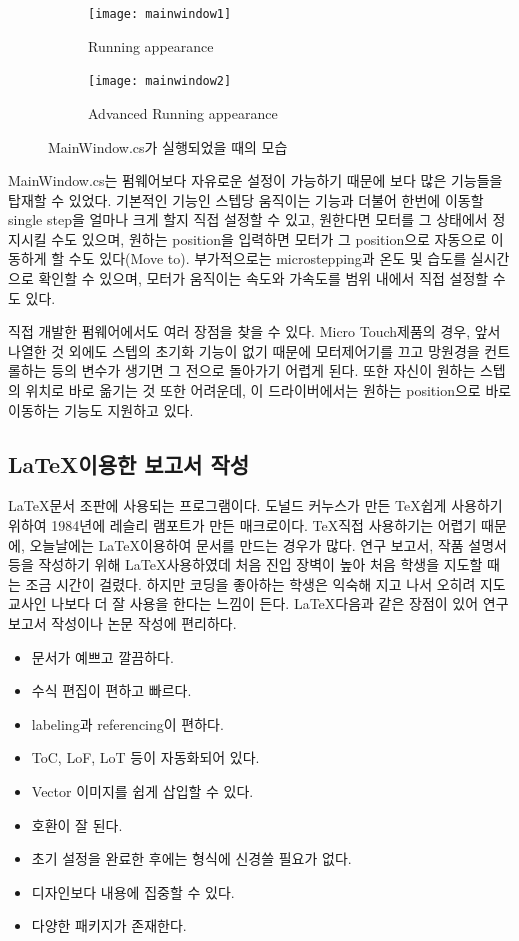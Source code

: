 \begin{figure}[h]
	\begin{subfigure}{0.5\textwidth}
		\begin{center}
			\texttt{[image: mainwindow1]} 
		\end{center}	
		\caption{Running appearance}
		\label{fig:mainwindow1}
	\end{subfigure}
	\begin{subfigure}{0.5\textwidth}
		\begin{center}			
			\texttt{[image: mainwindow2]}
		\end{center}
		\caption{Advanced Running appearance}
		\label{fig:mainwindow2}
	\end{subfigure}
	\caption{MainWindow.cs가 실행되었을 때의 모습}
	\label{fig:mainwindow}
\end{figure}

MainWindow.cs는 펌웨어보다 자유로운 설정이 가능하기 때문에 보다 많은 기능들을 탑재할 수 있었다. 기본적인 기능인 스텝당 움직이는 기능과 더불어 한번에 이동할 single step을 얼마나 크게 할지 직접 설정할 수 있고, 원한다면 모터를 그 상태에서 정지시킬 수도 있으며, 원하는 position을 입력하면 모터가 그 position으로 자동으로 이동하게 할 수도 있다(Move to). 부가적으로는 microstepping과 온도 및 습도를 실시간으로 확인할 수 있으며, 모터가 움직이는 속도와 가속도를 범위 내에서 직접 설정할 수도 있다.

직접 개발한 펌웨어에서도 여러 장점을 찾을 수 있다. Micro Touch제품의 경우, 앞서 나열한 것 외에도 스텝의 초기화 기능이 없기 때문에 모터제어기를 끄고 망원경을 컨트롤하는 등의 변수가 생기면 그 전으로 돌아가기 어렵게 된다. 또한 자신이 원하는 스텝의 위치로 바로 옮기는 것 또한 어려운데, 이 드라이버에서는 원하는 position으로 바로 이동하는 기능도 지원하고 있다. 


\subsection{\LaTeX\를 이용한 보고서 작성}

\LaTeX\은 문서 조판에 사용되는 프로그램이다. 도널드 커누스가 만든 \TeX\을 쉽게 사용하기 위하여 1984년에 레슬리 램포트가 만든 매크로이다. \TeX\을 직접 사용하기는 어렵기 때문에, 오늘날에는 \LaTeX\을 이용하여 문서를 만드는 경우가 많다. 연구 보고서, 작품 설명서 등을 작성하기 위해 \LaTeX\를 사용하였데 처음 진입 장벽이 높아 처음 학생을 지도할 때는 조금 시간이 걸렸다. 하지만 코딩을 좋아하는 학생은 익숙해 지고 나서 오히려 지도교사인 나보다 더 잘 사용을 한다는 느낌이 든다. \LaTeX\은 다음과 같은 장점이 있어 연구 보고서 작성이나 논문 작성에 편리하다. 

\begin{itemize}
\item 문서가 예쁘고 깔끔하다.
\item 수식 편집이 편하고 빠르다.
\item labeling과 referencing이 편하다.
\item ToC, LoF, LoT 등이 자동화되어 있다.
\item Vector 이미지를 쉽게 삽입할 수 있다.
\item 호환이 잘 된다.
\item 초기 설정을 완료한 후에는 형식에 신경쓸 필요가 없다.
\item 디자인보다 내용에 집중할 수 있다.
\item 다양한 패키지가 존재한다.
\end{itemize}	


